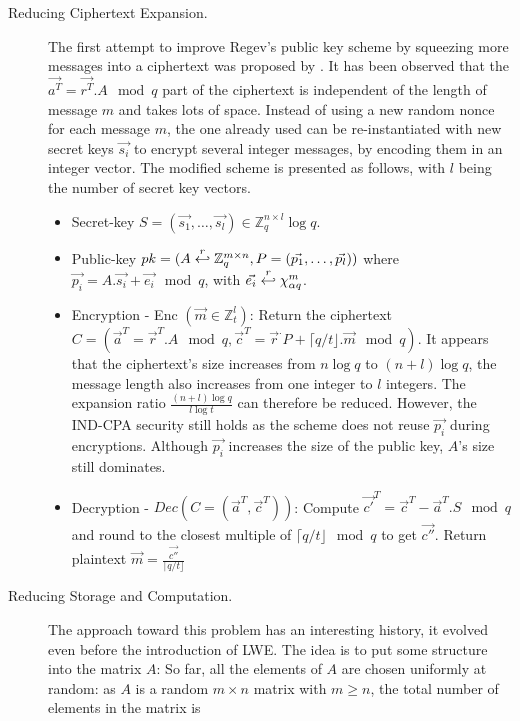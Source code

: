 \begin{description}
\item[Reducing Ciphertext Expansion.] The first attempt to improve Regev's public key scheme by squeezing more messages into a ciphertext was proposed by
  \cite{peikert2008framework} .  It has been observed that the
  $\vec{a^T} = \vec{r^T}. A \mod q$ part of the ciphertext is independent of the length of
  message $m$ and takes lots of space. Instead of using a new random nonce for
  each message $m$, the one already used can be re-instantiated with new secret keys
  $\vec{s_i}$ to encrypt several integer messages, by encoding them in an integer
  vector. The modified scheme is presented as follows, with $l$ being the number
  of secret key vectors.
  \begin{itemize}
  \item Secret-key
    $S = (\vec{s_1}, \dots, \vec{s_l}) \in \mathbb{Z}_q^{n \times l} \log q$.
  \item Public-key
    $pk = (A \stackrel{r}{\hookleftarrow} \mathbb{Z}_q^{m \times n},P=(\vec{p_1}, \dots,
    \vec{p_l}))$ where $\vec{p_i} = A.\vec{s_i} + \vec{e_i} \mod q$, with
    $\vec{e_i} \stackrel{r}{\hookleftarrow} \chi_{\alpha q}^m$.
  \item Encryption - Enc $(\vec{m} \in \mathbb{Z}_t^l)$: Return the ciphertext
    $C = (\vec{a}^T= \vec{r}^T.A \mod q, \vec{c}^T = \vec{r}^.P + \lceil q/t
    \rfloor . \vec{m} \mod q)$. It appears that the ciphertext's size increases from
    $n\log q$ to $(n+l)\log q$, the message length also increases from one
    integer to $l$ integers. The expansion ratio $\frac{(n+l)\log q}{l \log t}$
    can therefore be reduced. However, the IND-CPA security still holds as the scheme
    does not reuse $\vec{p_i}$ during encryptions. Although $\vec{p_i}$ increases the size of
    the public key, $A$'s size still dominates.
  \item Decryption - $Dec(C = (\vec{a}^T, \vec{c}^T))$: Compute
    $\vec{c'}^T = \vec{c}^T - \vec{a}^T.S \mod q$ and round to the closest
    multiple of $\lceil q/t \rfloor \mod q$ to get $\vec{c''}$. Return plaintext
    $\vec{m} = \frac{\vec{c''}}{\lceil q/t \rfloor}$
  \end{itemize}
\item [Reducing Storage and Computation.] The approach toward this problem has
  an interesting history, it evolved even before the introduction of LWE. The
  idea is to put some structure into the matrix $A$: So far, all the elements of
  $A$ are chosen uniformly at random: as $A$ is a random $m \times n$
  matrix with $m \geq n$, the total number of elements in the matrix is

\end{description}
